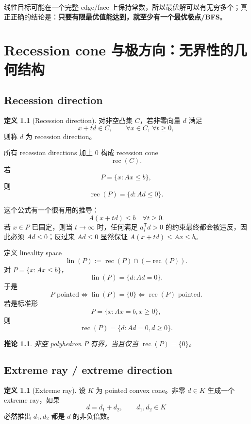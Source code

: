 \documentclass[11pt,a4paper,openany]{ctexrep}
\newtheorem{corollary}[theorem]{推论}
\theoremstyle{definition}
\newtheorem{definition}[theorem]{定义}
\newcommand{\rec}{\operatorname{rec}}
\newcommand{\lin}{\operatorname{lin}}
\newcommand{\transpose}{\mathsf{T}}
\begin{document}
\begin{warningbox}
线性目标可能在一个完整 edge/face 上保持常数，所以最优解可以有无穷多个；真正正确的结论是：\textbf{只要有限最优值能达到，就至少有一个最优极点/BFS}。
\end{warningbox}

\chapter{Recession cone 与极方向：无界性的几何结构}

\section{Recession direction}

\begin{definition}[Recession direction]
对非空凸集 $C$，若非零向量 $d$ 满足
\[
x+td\in C,
\qquad \forall x\in C,\ \forall t\ge0,
\]
则称 $d$ 为 recession direction。
\end{definition}

所有 recession directions 加上 $0$ 构成 recession cone
\[
\rec(C).
\]
若
\[
P=\{x:Ax\le b\},
\]
则
\[
\rec(P)=\{d:Ad\le0\}.
\]

这个公式有一个很有用的推导：
\[
A(x+td)\le b\quad\forall t\ge0.
\]
若 $x\in P$ 已固定，则当 $t\to\infty$ 时，任何满足 $a_i^\transpose d>0$ 的约束最终都会被违反，因此必须 $Ad\le0$；反过来 $Ad\le0$ 显然保证 $A(x+td)\le Ax\le b$。

定义 lineality space
\[
\lin(P):=\rec(P)\cap(-\rec(P)).
\]
对 $P=\{x:Ax\le b\}$，
\[
\lin(P)=\{d:Ad=0\}.
\]
于是
\[
P\text{ pointed}\Longleftrightarrow \lin(P)=\{0\}
\Longleftrightarrow \rec(P)\text{ pointed}.
\]
若是标准形
\[
P=\{x:Ax=b,x\ge0\},
\]
则
\begin{equation}
\rec(P)=\{d:Ad=0,d\ge0\}.
\label{eq:standard-recession}
\end{equation}
\cite[\S4.8]{bertsimas}

\begin{corollary}
非空 polyhedron $P$ 有界，当且仅当 $\rec(P)=\{0\}$。
\end{corollary}

\section{Extreme ray / extreme direction}

\begin{definition}[Extreme ray]
设 $K$ 为 pointed convex cone。非零 $d\in K$ 生成一个 extreme ray，如果
\[
d=d_1+d_2,\qquad d_1,d_2\in K
\]
必然推出 $d_1,d_2$ 都是 $d$ 的非负倍数。
\end{definition}
\end{document}
